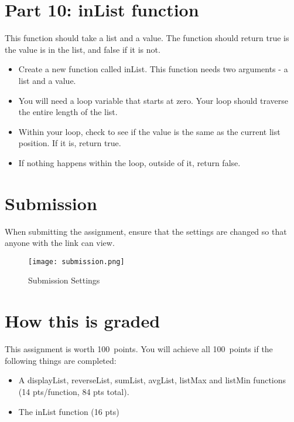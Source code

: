 \documentclass{article}
\newcommand{\AValue}{100}
\begin{document}
\section*{Part 10: inList function}
This function should take a list and a value.  The function should return true is the value is in the list, and false if it is not.
\begin{itemize}
	\item Create a new function called inList.  This function needs two arguments - a list and a value.
	\item You will need a loop variable that starts at zero.  Your loop should traverse the entire length of the list.
	\item Within your loop, check to see if the value is the same as the current list position.  If it is, return true.
	\item If nothing happens within the loop, outside of it, return false.
\end{itemize}

\section*{Submission}
When submitting the assignment, ensure that the settings are changed so that anyone with the link can view.
\begin{figure}[H]
  \centering
  \texttt{[image: submission.png]}
  \caption{Submission Settings}
\end{figure}

\section*{How this is graded}
This assignment is worth \AValue \ points. You will achieve all \AValue \   points if the following things are completed:
\begin{itemize}
    \item A displayList, reverseList, sumList, avgList, listMax and listMin functions (14 pts/function, 84 pts total).
    \item The inList function (16 pts)
\end{itemize}
\end{document}
